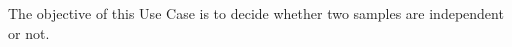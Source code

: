 \renewcommand{\filename}{docUC_InputWithData_IndependenceTest.tex}
\renewcommand{\filetitle}{UC : Are two scalar samples independent : ChiSquared test, Pearson test, Spearman test}

\HeaderIIILevel




The objective of this Use Case is to decide whether two samples are independent or not.\\



